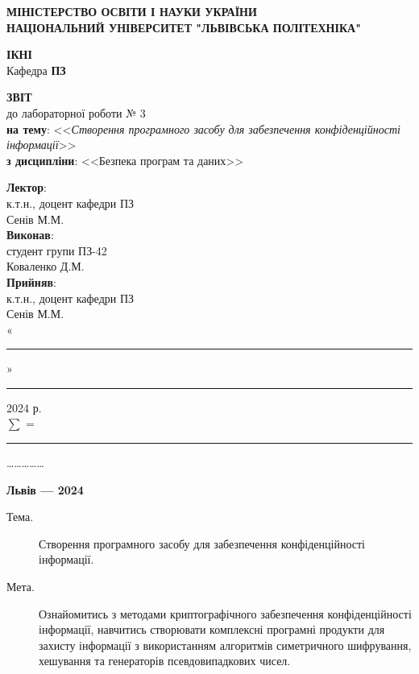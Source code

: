 \documentclass[oneside,14pt]{extarticle}
\newcommand\subject{Безпека програм та даних}
\newcommand\lecturer{к.т.н., доцент кафедри ПЗ\\Сенів М.М.}
\newcommand\teacher{к.т.н., доцент кафедри ПЗ\\Сенів М.М.}
\newcommand\mygroup{ПЗ-42}
\newcommand\lab{3}
\newcommand\theme{Створення програмного засобу для забезпечення конфіденційності інформації}
\newcommand\purpose{Ознайомитись з методами криптографічного забезпечення
	конфіденційності інформації, навчитись створювати комплексні програмні
	продукти для захисту інформації з використанням алгоритмів симетричного
	шифрування, хешування та генераторів псевдовипадкових чисел}
\begin{document}
\begin{normalsize}
	\begin{titlepage}
		\thispagestyle{empty}
		\begin{center}
			\textbf{МІНІСТЕРСТВО ОСВІТИ І НАУКИ УКРАЇНИ\\
				НАЦІОНАЛЬНИЙ УНІВЕРСИТЕТ "ЛЬВІВСЬКА ПОЛІТЕХНІКА"}
		\end{center}
		\begin{flushright}
			\textbf{ІКНІ}\\
			Кафедра \textbf{ПЗ}
		\end{flushright}
		\vspace{80pt}
		\begin{center}
			\textbf{ЗВІТ}\\
			\vspace{10pt}
			до лабораторної роботи № \lab\\
			\textbf{на тему}: <<\textit{\theme}>>\\
			\textbf{з дисципліни}: <<\subject>>
		\end{center}
		\vspace{80pt}
		\begin{flushright}
			
			\textbf{Лектор}:\\
			\lecturer\\
			\vspace{28pt}
			\textbf{Виконав}:\\
			
			студент групи \mygroup\\
			Коваленко Д.М.\\
			\vspace{28pt}
			\textbf{Прийняв}:\\
			
			\teacher\\
			
			\vspace{28pt}
			«\rule{1cm}{0.15mm}» \rule{1.5cm}{0.15mm} 2024 р.\\
			$\sum$ = \rule{1cm}{0.15mm}……………\\
			
		\end{flushright}
		\vspace{\fill}
		\begin{center}
			\textbf{Львів — 2024}
		\end{center}
	\end{titlepage}
		
	\begin{description}
		\item[Тема.] \theme.
		\item[Мета.] \purpose.
	\end{description}


\end{normalsize}
\end{document}
